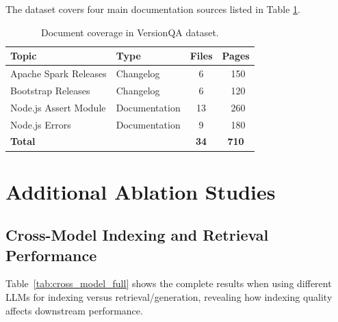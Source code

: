 The dataset covers four main documentation sources listed in Table \ref{tab:document_coverage}.

\begin{table}[hb]
\centering
\small
\caption{Document coverage in VersionQA dataset.}
\begin{tabular}{llcc}
\hline
\textbf{Topic} & \textbf{Type} & \textbf{Files} & \textbf{Pages} \\ \hline
Apache Spark Releases & Changelog & 6 & ~150 \\
Bootstrap Releases & Changelog & 6 & ~120 \\
Node.js Assert Module & Documentation & 13 & ~260 \\
Node.js Errors & Documentation & 9 & ~180 \\ \hline
\textbf{Total} & & \textbf{34} & \textbf{710} \\ \hline
\end{tabular}
\label{tab:document_coverage}
\end{table}


\newpage


\section{Additional Ablation Studies}

\subsection{Cross-Model Indexing and Retrieval Performance}

Table~\ref{tab:cross_model_full} shows the complete results when using different LLMs for indexing versus retrieval/generation, revealing how indexing quality affects downstream performance.

